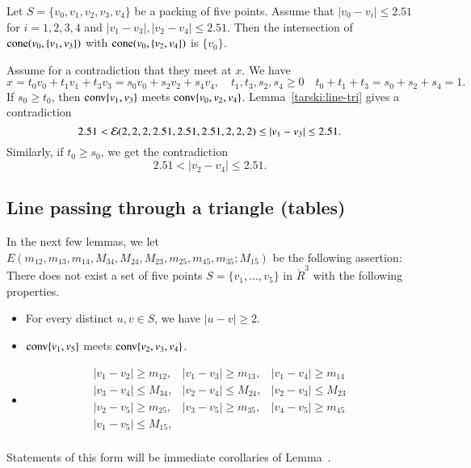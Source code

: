 \begin{tarskidata}
\begin{tarski}
\begin{lemma}
Let $S=\{v_0,v_1,v_2,v_3,v_4\}$ be a packing of five points.
Assume  that $|v_0-v_i|\le 2.51$ for $i=1,2,3,4$ and
$|v_1-v_3|,|v_2-v_4|\le 2.51$. Then the intersection of
${\operatorname{cone}}(v_0,\{v_1,v_3\})$ with
${\operatorname{cone}}(v_0,\{v_2,v_4\})$ is $\{v_0\}$.
\end{lemma}

\begin{proved} Assume for a contradiction that they meet at $x$.
We have
  $$x = t_0 v_0 + t_1 v_1 + t_3 v_3 = s_0 v_0 + s_2 v_2 + s_4 v_4,
  \quad t_1,t_3,s_2,s_4\ge0\quad t_0+t_1+t_3=s_0+s_2+s_4=1.
  $$
If $s_0\ge t_0$, then ${\operatorname{conv}}\{v_1,v_3\}$ meets 
${\operatorname{conv}}\{v_0,v_2,v_4\}$.  
Lemma~\ref{tarski:line-tri} gives a 
contradiction
    $$2.51 < {\mathcal E}(2,2,2,2.51,2.51,2.51,2,2,2) \le |v_1-v_3|\le 2.51.$$
Similarly, if $t_0\ge s_0$, we get the contradiction
    $$2.51 < |v_2-v_4|\le 2.51.$$
\swallowed\end{proved}
\end{tarski}








\begin{tarski}
\section{Line passing through a triangle (tables)}

\begin{definition}
In the next few lemmas, we let
$E(m_{12},m_{13},m_{14},M_{34},M_{24},M_{23},m_{25},m_{45},m_{35};M_{15})$ 
be the following assertion:
There does not exist a set of five points $S=\{v_1,\ldots,v_5\}$ in
$\ring{R}^3$ with the following properties.
\begin{itemize}
  \item For every distinct $u,v\in S$, we have $|u-v|\ge 2$.
    \item ${\operatorname{conv}}\{v_1,v_5\}$ meets ${\operatorname{conv}}\{v_2,v_3,v_4\}$.
  \item $$
    \begin{array}{lll}
      |v_1-v_2|\ge m_{12}, &|v_1-v_3|\ge m_{13}, &|v_1-v_4|\ge m_{14}\\
      |v_3-v_4|\le M_{34}, &|v_2-v_4|\le M_{24}, &|v_2-v_3|\le M_{23}\\
      |v_2-v_5|\ge m_{25}, &|v_3-v_5|\ge m_{35}, &|v_4-v_5|\ge m_{45}\\
      |v_1-v_5|\le M_{15},\\
      \end{array}
    $$
\end{itemize}
\end{definition}
Statements of this form will be immediate corollaries of Lemma~.
\end{tarski}




\end{tarskidata}
